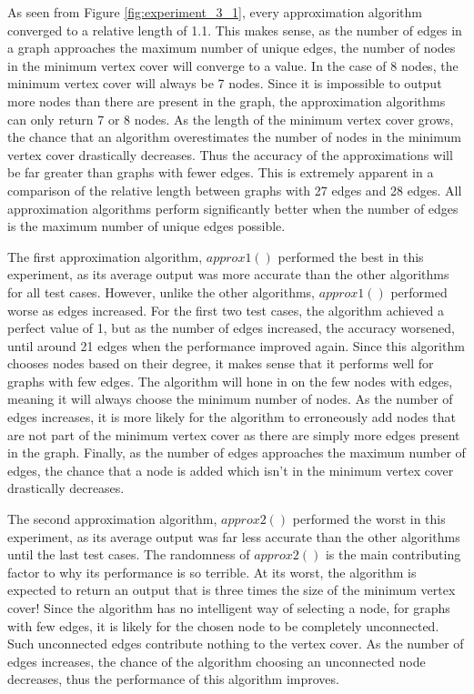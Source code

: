 \documentclass[titlepage]{article}
\begin{document}
As seen from Figure \ref{fig:experiment_3_1}, every approximation algorithm converged to a relative length of 1.1. This makes sense, as the number of edges in a graph approaches the maximum number of unique edges, the number of nodes in the minimum vertex cover will converge to a value. In the case of 8 nodes, the minimum vertex cover will always be 7 nodes. Since it is impossible to output more nodes than there are present in the graph, the approximation algorithms can only return 7 or 8 nodes. As the length of the minimum vertex cover grows, the chance that an algorithm overestimates the number of nodes in the minimum vertex cover drastically decreases. Thus the accuracy of the approximations will be far greater than graphs with fewer edges. This is extremely apparent in a comparison of the relative length between graphs with 27 edges and 28 edges. All approximation algorithms perform significantly better when the number of edges is the maximum number of unique edges possible.

The first approximation algorithm, $approx1()$ performed the best in this experiment, as its average output was more accurate than the other algorithms for all test cases. However, unlike the other algorithms, $approx1()$ performed worse as edges increased. For the first two test cases, the algorithm achieved a perfect value of 1, but as the number of edges increased, the accuracy worsened, until around 21 edges when the performance improved again. Since this algorithm chooses nodes based on their degree, it makes sense that it performs well for graphs with few edges. The algorithm will hone in on the few nodes with edges, meaning it will always choose the minimum number of nodes. As the number of edges increases, it is more likely for the algorithm to erroneously add nodes that are not part of the minimum vertex cover as there are simply more edges present in the graph. Finally, as the number of edges approaches the maximum number of edges, the chance that a node is added which isn't in the minimum vertex cover drastically decreases.

The second approximation algorithm, $approx2()$ performed the worst in this experiment, as its average output was far less accurate than the other algorithms until the last test cases.
The randomness of $approx2()$ is the main contributing factor to why its performance is so terrible. At its worst, the algorithm is expected to return an output that is three times the size of the minimum vertex cover! Since the algorithm has no intelligent way of selecting a node, for graphs with few edges, it is likely for the chosen node to be completely unconnected. Such unconnected edges contribute nothing to the vertex cover. As the number of edges increases, the chance of the algorithm choosing an unconnected node decreases, thus the performance of this algorithm improves.
\end{document}
